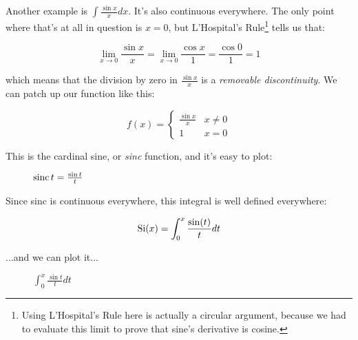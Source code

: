 Another example is $\int \frac{\sin x}{x} dx$.  It's also continuous everywhere.  The only point
where that's at all in question is $x=0$, but L'Hospital's Rule\footnote{Using L'Hospital's Rule here is actually
a circular argument, because we had to evaluate this limit to prove that sine's derivative is cosine.} tells us that:

$$\lim_{x\to 0} \frac{\sin x}{x} = \lim_{x\to 0} \frac{\cos x}{1} = \frac{\cos 0}{1} = 1$$

which means that the division by zero in $\frac{\sin x}{x}$ is a {\it removable discontinuity}.
We can patch up our function like this:

\[ f(x) = \begin{cases} 
      \frac{\sin x}{x} & x \ne 0 \\
      1 & x = 0
   \end{cases}
\]

This is the cardinal sine, or {\it sinc} function, and it's easy to plot:

\begin{figure}[H]
\begin{center}
\begin{comment}
\begin{maximacode}
sinc(x) := if x = 0 then 1 else sin(x)/x$
pdfplot2d (sinc(x),
           [x, -20, 20], [ylabel, false], [grid2d, true], [legend, false],
           [color, red])$
\end{maximacode}
\end{comment}
\end{center}
\caption{${\rm sinc\,} t = \frac{\sin t}{t}$}
\end{figure}

Since sinc is continuous everywhere, this integral is well defined everywhere:

$${\rm Si}(x) = \int_0^x \frac{\sin(t)}{t} dt$$

...and we can plot it...

\begin{figure}[H]
\begin{center}
\begin{comment}
\begin{maximacode}
Si(x) := (quad_qag(sinc, t, 0, x, 1)[1])$
pdfplot2d (Si(x),
          [x, -20, 20], [ylabel, false], [grid2d, true], [legend, false],
          [color, red])$
\end{maximacode}
\end{comment}
\end{center}
\caption{$\int_0^x \frac{\sin t}{t} dt$}
\end{figure}

